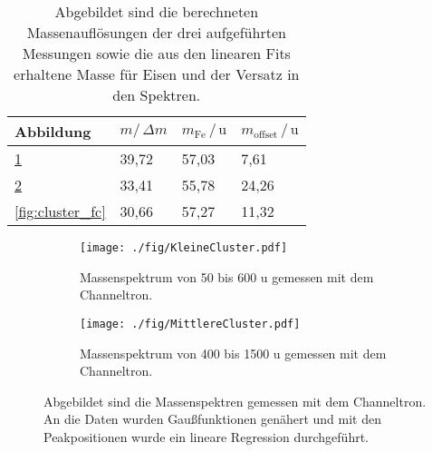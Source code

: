 \begin{table}
  \centering
  \caption{Abgebildet sind die berechneten Massenauflösungen der drei aufgeführten Messungen sowie die aus den linearen Fits erhaltene Masse für Eisen und der Versatz in den Spektren.}
  \label{tab:msfitdata}
  \begin{tabular}{llll}
      \toprule
      Abbildung	&	$m/\,\Delta m $	&	$m_\text{Fe}\,/\,\text{u}$	&	$m_\text{offset}\,/\,\text{u}$	\\
      \midrule
      \ref{fig:cluster_small}	&	39,72	&	57,03	&	7,61	\\
      \ref{fig:cluster_medium}	&	33,41	&	55,78	&	24,26	\\
      \ref{fig:cluster_fc}	&	30,66	&	57,27	&	11,32	\\


      \bottomrule
  \end{tabular}
\end{table}


\begin{figure}
  \begin{subfigure}[h]{1\textwidth}
    \texttt{[image: ./fig/KleineCluster.pdf]}
    \caption{Massenspektrum von 50 bis 600 u gemessen mit dem Channeltron.}
    \label{fig:cluster_small}
  \end{subfigure}\hfill
  \begin{subfigure}[t]{1\textwidth}
    \texttt{[image: ./fig/MittlereCluster.pdf]}
    \caption{Massenspektrum von 400 bis 1500 u gemessen mit dem Channeltron.}
    \label{fig:cluster_medium}
  \end{subfigure}
  \caption{Abgebildet sind die Massenspektren gemessen mit dem Channeltron. An die Daten wurden Gaußfunktionen genähert und mit den Peakpositionen wurde ein lineare Regression durchgeführt.}
  \label{fig:cluster_chtr}
\end{figure}

